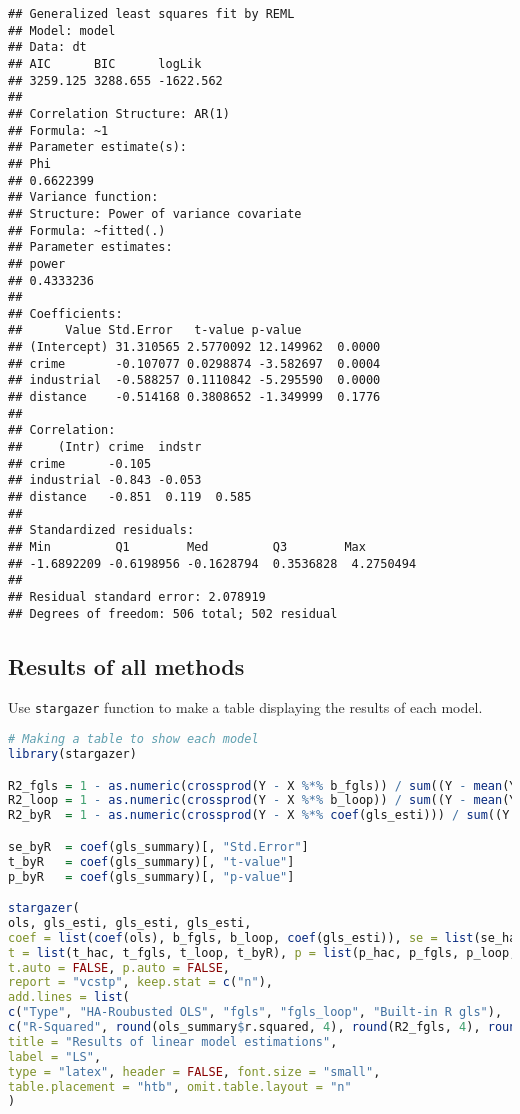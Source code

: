 \documentclass{article}
\theoremstyle{definition}
\begin{document}
\begin{Verbatim}
## Generalized least squares fit by REML
## Model: model 
## Data: dt 
## AIC      BIC      logLik
## 3259.125 3288.655 -1622.562
##
## Correlation Structure: AR(1)
## Formula: ~1 
## Parameter estimate(s):
## Phi 
## 0.6622399 
## Variance function:
## Structure: Power of variance covariate
## Formula: ~fitted(.) 
## Parameter estimates:
## power 
## 0.4333236 
##
## Coefficients:
## 		Value Std.Error   t-value p-value
## (Intercept) 31.310565 2.5770092 12.149962  0.0000
## crime       -0.107077 0.0298874 -3.582697  0.0004
## industrial  -0.588257 0.1110842 -5.295590  0.0000
## distance    -0.514168 0.3808652 -1.349999  0.1776
## 
## Correlation: 
## 	   (Intr) crime  indstr
## crime      -0.105              
## industrial -0.843 -0.053       
## distance   -0.851  0.119  0.585
##
## Standardized residuals:
## Min         Q1        Med         Q3        Max 
## -1.6892209 -0.6198956 -0.1628794  0.3536828  4.2750494 
## 
## Residual standard error: 2.078919 
## Degrees of freedom: 506 total; 502 residual
\end{Verbatim}



\subsection{Results of all methods}
Use \texttt{stargazer} function to make a table displaying the results of each model.\\

\begin{lstlisting}[language = R]
# Making a table to show each model
library(stargazer)

R2_fgls = 1 - as.numeric(crossprod(Y - X %*% b_fgls)) / sum((Y - mean(Y))^2)
R2_loop = 1 - as.numeric(crossprod(Y - X %*% b_loop)) / sum((Y - mean(Y))^2)
R2_byR  = 1 - as.numeric(crossprod(Y - X %*% coef(gls_esti))) / sum((Y - mean(Y))^2)

se_byR  = coef(gls_summary)[, "Std.Error"]
t_byR   = coef(gls_summary)[, "t-value"]
p_byR   = coef(gls_summary)[, "p-value"]

stargazer(
ols, gls_esti, gls_esti, gls_esti, 
coef = list(coef(ols), b_fgls, b_loop, coef(gls_esti)), se = list(se_hac, se_fgls, se_loop, se_byR),
t = list(t_hac, t_fgls, t_loop, t_byR), p = list(p_hac, p_fgls, p_loop, p_byR),
t.auto = FALSE, p.auto = FALSE,
report = "vcstp", keep.stat = c("n"),
add.lines = list(
c("Type", "HA-Roubusted OLS", "fgls", "fgls_loop", "Built-in R gls"),
c("R-Squared", round(ols_summary$r.squared, 4), round(R2_fgls, 4), round(R2_loop, 4), round(R2_byR, 4))),
title = "Results of linear model estimations",
label = "LS",
type = "latex", header = FALSE, font.size = "small",
table.placement = "htb", omit.table.layout = "n"
)
\end{lstlisting}
\end{document}
